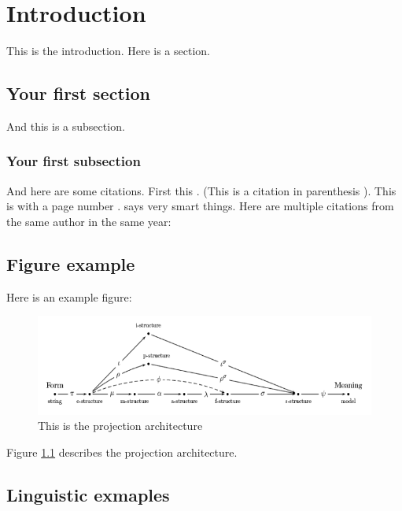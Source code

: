 \chapter{Introduction}
\label{ch:introduction}

This is the introduction. Here is a section.

\section{Your first section}

And this is a subsection.

\subsection{Your first subsection}

And here are some citations. First this \cite{kalouli2022negation}. (This is a citation in parenthesis \citealt{kalouli2022negation}). This is with a page number \citep[p. 5]{kalouli2022negation}. \citet{kalouli2022negation} says very smart things. Here are multiple citations from the same author in the same year: \citet{zymla2024ambiguity,Zymla2024}

\section{Figure example}

Here is an example figure:

\begin{figure}
    \centering
    \includegraphics[scale=0.5]{upload/tex/figures/parallelprojection.png}
    \caption{This is the projection architecture}
    \label{fig-label1}
\end{figure}

Figure \ref{fig-label1} describes the projection architecture. 

\section{Linguistic exmaples}

